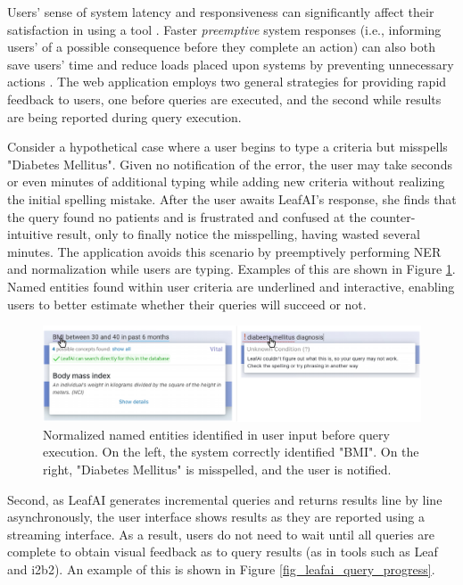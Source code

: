 \documentclass[../main.tex]{subfiles}
\begin{document}
Users' sense of system latency and responsiveness can significantly affect their satisfaction in using a tool \cite{li2019effects, arapakis2014impact, shneiderman1984response}. Faster \textit{preemptive} system responses (i.e., informing users' of a possible consequence before they complete an action) can also both save users' time and reduce loads placed upon systems by preventing unnecessary actions \cite{lempel2003predictive, diaz2016search}. The web application employs two general strategies for providing rapid feedback to users, one before queries are executed, and the second while results are being reported during query execution.

Consider a hypothetical case where a user begins to type a criteria but misspells "Diabetes Mellitus". Given no notification of the error, the user may take seconds or even minutes of additional typing while adding new criteria without realizing the initial spelling mistake. After the user awaits LeafAI's response, she finds that the query found no patients and is frustrated and confused at the counter-intuitive result, only to finally notice the misspelling, having wasted several minutes. The application avoids this scenario by preemptively performing NER and normalization while users are typing. Examples of this are shown in Figure \ref{fig_leafai_mouse_hover}. Named entities found within user criteria are underlined and interactive, enabling users to better estimate whether their queries will succeed or not.

\begin{figure}[H]
  \centering
  \includegraphics[scale=0.55]{Figures/8_web_application/leafai_normalization.pdf}  
  \caption{Normalized named entities identified in user input before query execution. On the left, the system correctly identified "BMI". On the right, "Diabetes Mellitus" is misspelled, and the user is notified.}
\label{fig_leafai_mouse_hover}
\end{figure}

Second, as LeafAI generates incremental queries and returns results line by line asynchronously, the user interface shows results as they are reported using a streaming interface. As a result, users do not need to wait until all queries are complete to obtain visual feedback as to query results (as in tools such as Leaf and i2b2). An example of this is shown in Figure \ref{fig_leafai_query_progress}.
\end{document}
